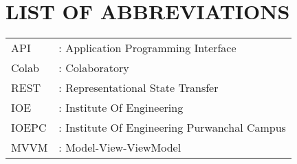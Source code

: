 \newpage
\chapter*{LIST OF ABBREVIATIONS}
\begin{tabular}{l l}
API	&	:	Application Programming Interface	\\
Colab	&	:	Colaboratory	\\
REST	&	:	Representational State Transfer	\\
IOE	&	:	Institute Of Engineering	\\
IOEPC	&	:	Institute Of Engineering Purwanchal Campus	\\
MVVM	&	:	Model-View-ViewModel	\\
 


\end{tabular}








